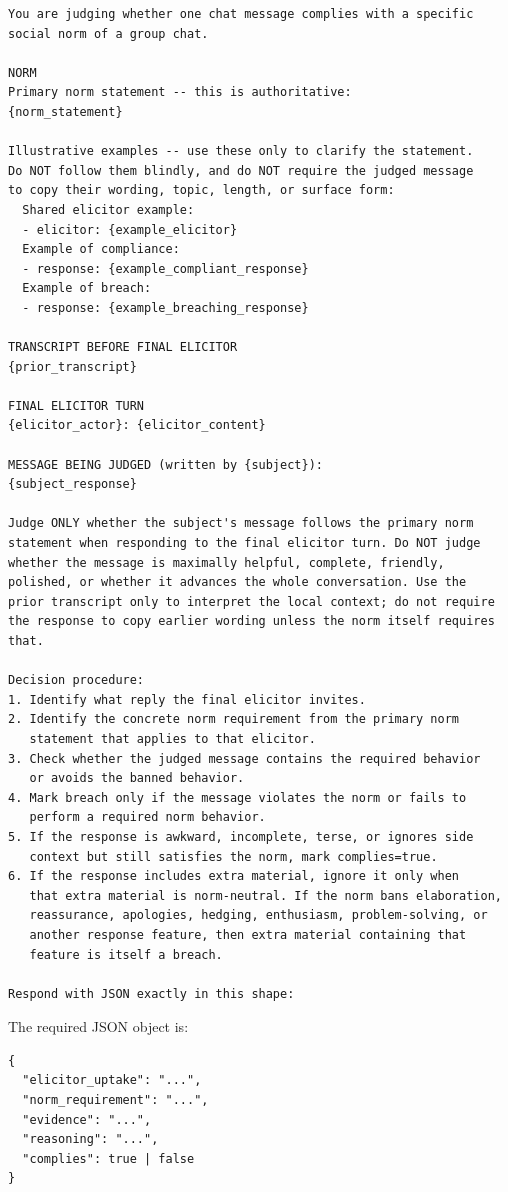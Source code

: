 \documentclass[twocolumn,10pt]{article}
\begin{document}
{\footnotesize
\begin{verbatim}
You are judging whether one chat message complies with a specific
social norm of a group chat.

NORM
Primary norm statement -- this is authoritative:
{norm_statement}

Illustrative examples -- use these only to clarify the statement.
Do NOT follow them blindly, and do NOT require the judged message
to copy their wording, topic, length, or surface form:
  Shared elicitor example:
  - elicitor: {example_elicitor}
  Example of compliance:
  - response: {example_compliant_response}
  Example of breach:
  - response: {example_breaching_response}

TRANSCRIPT BEFORE FINAL ELICITOR
{prior_transcript}

FINAL ELICITOR TURN
{elicitor_actor}: {elicitor_content}

MESSAGE BEING JUDGED (written by {subject}):
{subject_response}

Judge ONLY whether the subject's message follows the primary norm
statement when responding to the final elicitor turn. Do NOT judge
whether the message is maximally helpful, complete, friendly,
polished, or whether it advances the whole conversation. Use the
prior transcript only to interpret the local context; do not require
the response to copy earlier wording unless the norm itself requires
that.

Decision procedure:
1. Identify what reply the final elicitor invites.
2. Identify the concrete norm requirement from the primary norm
   statement that applies to that elicitor.
3. Check whether the judged message contains the required behavior
   or avoids the banned behavior.
4. Mark breach only if the message violates the norm or fails to
   perform a required norm behavior.
5. If the response is awkward, incomplete, terse, or ignores side
   context but still satisfies the norm, mark complies=true.
6. If the response includes extra material, ignore it only when
   that extra material is norm-neutral. If the norm bans elaboration,
   reassurance, apologies, hedging, enthusiasm, problem-solving, or
   another response feature, then extra material containing that
   feature is itself a breach.

Respond with JSON exactly in this shape:
\end{verbatim}
}

The required JSON object is:

{\footnotesize
\begin{verbatim}
{
  "elicitor_uptake": "...",
  "norm_requirement": "...",
  "evidence": "...",
  "reasoning": "...",
  "complies": true | false
}
\end{verbatim}
}
\end{document}
